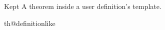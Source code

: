 \begin{flmUEkeptthm}{Kept}
A theorem inside a user definition's template.
\end{flmUEkeptthm}%
\RequirePackage{amsthm}
\RequirePackage{zref-clever}
\ProvideDocumentCommand{}
\ProvideDocumentCommand\noproofref{}{}
\ifcsname th@definitionlike\endcsname\else{}\fi
\ProvideDocumentCommand{}
%
%
